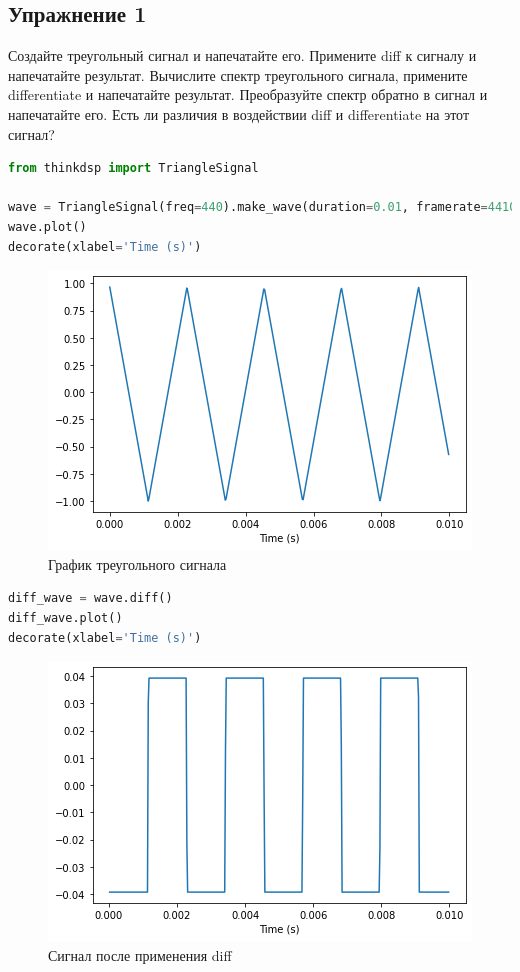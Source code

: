 \subsection{Упражнение 1}

Создайте треугольный сигнал и напечатайте его. Примените diff к сигналу и напечатайте результат. Вычислите спектр треугольного сигнала, примените differentiate и напечатайте результат. Преобразуйте спектр обратно в сигнал и напечатайте его. Есть ли различия в воздействии diff и differentiate на этот сигнал?

\begin{lstlisting}[language=Python]
from thinkdsp import TriangleSignal

wave = TriangleSignal(freq=440).make_wave(duration=0.01, framerate=44100)
wave.plot()
decorate(xlabel='Time (s)')
\end{lstlisting}
\begin{figure}[H]
	\begin{center}
		\includegraphics[scale=1]{fig/lab09/lab09_1.png}
		\caption{График треугольного сигнала}
	\end{center}
\end{figure}

\begin{lstlisting}[language=Python]
diff_wave = wave.diff()
diff_wave.plot()
decorate(xlabel='Time (s)')
\end{lstlisting}
\begin{figure}[H]
	\begin{center}
		\includegraphics[scale=1]{fig/lab09/lab09_2.png}
		\caption{Сигнал после применения diff}
	\end{center}
\end{figure}

